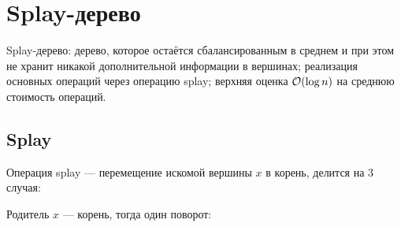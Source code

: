 \section{Splay-дерево}
Splay-дерево: дерево, которое остаётся сбалансированным
в среднем и при этом не хранит никакой
дополнительной информации в вершинах;
реализация основных операций через операцию splay;
верхняя оценка $\mathcal{O}(\log n)$ на среднюю стоимость операций.

\subsection{Splay}
Операция splay --- перемещение
искомой вершины $x$ в корень,
делится на 3 случая:

\noindent
\begin{minipage}{\textwidth}
    Родитель $x$ --- корень,
    тогда один поворот:

    \begin{center}
    \end{center}
\end{minipage}

\vspace{3em}


